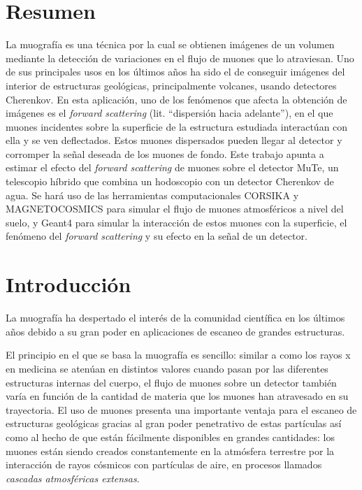 \documentclass[12pt]{report}
\begin{document}

\section*{Resumen}

La muografía es una técnica por la cual se obtienen imágenes de un volumen mediante la detección de variaciones en el flujo de muones que lo atraviesan. Uno de sus principales usos en los últimos años ha sido el de conseguir imágenes del interior de estructuras geológicas, principalmente volcanes, usando detectores Cherenkov. En esta aplicación, uno de los fenómenos que afecta la obtención de imágenes es el \textit{forward scattering} (lit. ``dispersión hacia adelante''), en el que muones incidentes sobre la superficie de la estructura estudiada interactúan con ella y se ven deflectados. Estos muones dispersados pueden llegar al detector y corromper la señal deseada de los muones de fondo. Este trabajo apunta a estimar el efecto del \textit{forward scattering} de muones sobre el detector MuTe, un telescopio híbrido que combina un hodoscopio con un detector Cherenkov de agua. Se hará uso de las herramientas computacionales CORSIKA y MAGNETOCOSMICS para simular el flujo de muones atmosféricos a nivel del suelo, y Geant4 para simular la interacción de estos muones con la superficie, el fenómeno del \textit{forward scattering} y su efecto en la señal de un detector.


\section*{Introducción}



La muografía ha despertado el interés de la comunidad científica en los últimos años debido a su gran poder en aplicaciones de escaneo de grandes estructuras.

El principio en el que se basa la muografía es sencillo: similar a como los rayos x en medicina se atenúan en distintos valores cuando pasan por las diferentes estructuras internas del cuerpo, el flujo de muones sobre un detector también varía en función de la cantidad de materia que los muones han atravesado en su trayectoria. El uso de muones presenta una importante ventaja para el escaneo de estructuras geológicas gracias al gran poder penetrativo de estas partículas así como al hecho de que están fácilmente disponibles en grandes cantidades: los muones están siendo creados constantemente en la atmósfera terrestre por la interacción de rayos cósmicos con partículas de aire, en procesos llamados \textit{cascadas atmosféricas extensas}.
\end{document}
